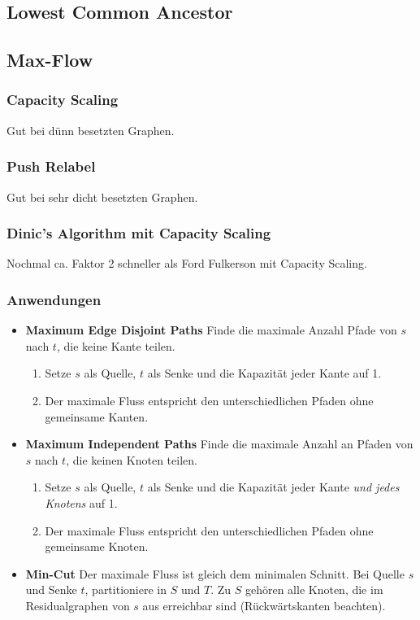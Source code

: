 \subsection{Lowest Common Ancestor}


\subsection{Max-Flow}

\subsubsection{Capacity Scaling}
Gut bei dünn besetzten Graphen.


\subsubsection{Push Relabel}
Gut bei sehr dicht besetzten Graphen.


\subsubsection{Dinic's Algorithm mit Capacity Scaling}
Nochmal ca. Faktor 2 schneller als Ford Fulkerson mit Capacity Scaling.


\subsubsection{Anwendungen}
\begin{itemize}[nosep]
	\item \textbf{Maximum Edge Disjoint Paths}\newline
	Finde die maximale Anzahl Pfade von $s$ nach $t$, die keine Kante teilen.
	\begin{enumerate}[nosep]
		\item Setze $s$ als Quelle, $t$ als Senke und die Kapazität jeder Kante auf 1.
		\item Der maximale Fluss entspricht den unterschiedlichen Pfaden ohne gemeinsame Kanten.
	\end{enumerate}
	\item \textbf{Maximum Independent Paths}\newline
	Finde die maximale Anzahl an Pfaden von $s$ nach $t$, die keinen Knoten teilen.
	\begin{enumerate}[nosep]
		\item Setze $s$ als Quelle, $t$ als Senke und die Kapazität jeder Kante \emph{und jedes Knotens} auf 1.
		\item Der maximale Fluss entspricht den unterschiedlichen Pfaden ohne gemeinsame Knoten.
	\end{enumerate}
	\item \textbf{Min-Cut}\newline
	Der maximale Fluss ist gleich dem minimalen Schnitt.
	Bei Quelle $s$ und Senke $t$, partitioniere in $S$ und $T$.
	Zu $S$ gehören alle Knoten, die im Residualgraphen von $s$ aus erreichbar sind (Rückwärtskanten beachten).
\end{itemize}

